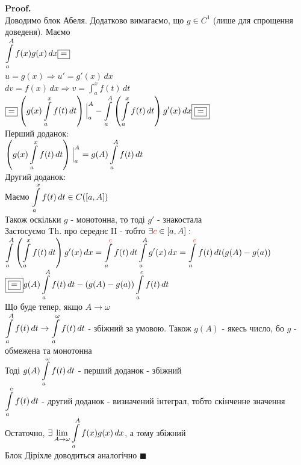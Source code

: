 \documentclass[a4paper, 14pt]{extarticle}
\def\huge{\displaystyle}
\def\bigline{\vspace{5mm}\\}
\theoremstyle{theoremdd}
\theoremstyle{theoremdd}
\theoremstyle{theoremdd}
\theoremstyle{theoremdd}
\theoremstyle{theoremdd}
\theoremstyle{theoremdd}
\theoremstyle{theoremdd}
\theoremstyle{theoremdd}
\newenvironment{pf}{\vspace*{-3mm} \textbf{Proof. \\}}{$\blacksquare$}
\begin{document}
\begin{pf}
Доводимо блок Абеля. Додатково вимагаємо, що $g \in C^1$ (лише для спрощення доведеня). Маємо\\
$\huge\int\displaylimits_a^A f(x)g(x)\,dx \boxed{=}$\\
$u = g(x) \Rightarrow u' = g'(x)\,dx$\\
$dv = f(x)\,dx \Rightarrow v = \huge\int_a^x f(t)\,dt$\\
$\boxed{=} \huge \left( g(x) \int\displaylimits_a^x f(t)\,dt \right)\Big|_a^A - \int\displaylimits_a^A \left( \int\displaylimits_a^x f(t)\,dt \right) g'(x)\,dx \boxed{\boxed{=}}$\\
Перший доданок:\\
$\huge \left( g(x) \int\displaylimits_a^x f(t)\,dt \right)\Big|_a^A = g(A) \huge\int\displaylimits_a^A f(t)\,dt$\\
Другий доданок:\\
Маємо $\huge\int\displaylimits_a^x f(t)\,dt \in C([a,A])$\\
Також оскільки $g$ - монотонна, то тоді $g'$ - знакостала\\
Застосуємо Th. про середнє II - тобто $\exists \textcolor{red}{c} \in [a,A]:$\\
$\huge \int\displaylimits_a^A \left( \int\displaylimits_a^x f(t)\,dt \right) g'(x)\,dx =\huge\int\displaylimits_a^{\textcolor{red}{c}} f(t)\,dt \int\displaylimits_a^A g'(x)\,dx = \huge\int\displaylimits_a^{\textcolor{red}{c}} f(t)\,dt (g(A)-g(a))$\\
$\boxed{\boxed{=}} g(A) \huge\int\displaylimits_a^A f(t)\,dt - (g(A)-g(a))\int\displaylimits_a^c f(t)\,dt$\\
Що буде тепер, якщо $A \to \omega$\\
$\huge\int\displaylimits_a^A f(t)\,dt \to \huge\int\displaylimits_a^\omega f(t)\,dt$ - збіжний за умовою. Також $g(A)$ - якесь число, бо $g$ - обмежена та монотонна\\
Тоді $g(A) \huge\int\displaylimits_a^\omega f(t)\,dt$ - перший доданок - збіжний\\
$\huge\int\displaylimits_a^c f(t)\,dt$ - другий доданок - визначений інтеграл, тобто скінченне значення\\
Остаточно, $\exists \huge\lim_{A \to \omega} \int\displaylimits_a^A f(x)g(x)\,dx$, а тому збіжний
\bigline
Блок Діріхле доводиться аналогічно
\end{pf}\\
\end{document}
